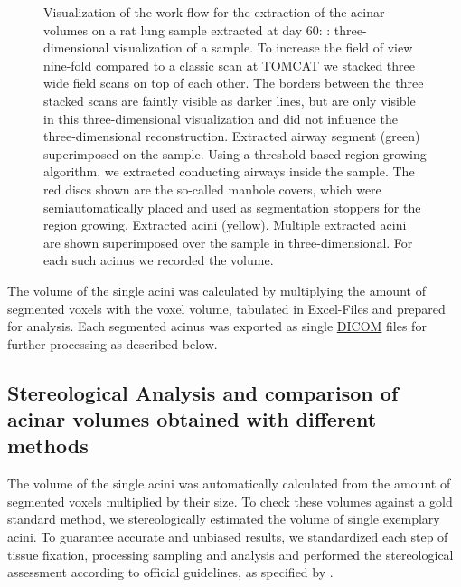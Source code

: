 \documentclass[%
	twoside,
	paper=a4,%
	abstract=true,%
	]{scrartcl}
\newlength\imagescale		%
\begin{document}
\begin{figure}
{%
		\label{subfig:extracted acini}%
		}
	\caption{Visualization of the work flow for the extraction of the acinar volumes on a rat lung sample extracted at day 60: %
		\protect{}: three-dimensional visualization of a sample. To increase the field of view nine-fold compared to a classic scan at TOMCAT we stacked three wide field scans on top of each other. The borders between the three stacked scans are faintly visible as darker lines, but are only visible in this three-dimensional visualization and did not influence the three-dimensional reconstruction. %
		\protect{} Extracted airway segment (green) superimposed on the sample. Using a threshold based region growing algorithm, we extracted conducting airways inside the sample. The red discs shown are the so-called manhole covers, which were semiautomatically placed and used as segmentation stoppers for the region growing. %
		\protect{} Extracted acini (yellow). Multiple extracted acini are shown superimposed over the sample in three-dimensional. For each such acinus we recorded the volume.%
		}
	\label{fig:workflow}
\end{figure}

The volume of the single acini was calculated by multiplying the amount of segmented voxels with the voxel volume, tabulated in Excel-Files and prepared for analysis. Each segmented acinus was exported as single \href{https://secure.wikimedia.org/wikipedia/en/w/index.php?title=Digital_Imaging_and_Communications_in_Medicine&oldid=415023605}{DICOM} files for further processing as described below.

\subsection{Stereological Analysis and comparison of acinar volumes obtained with different methods}
The volume of the single acini was automatically calculated from the amount of segmented voxels multiplied by their size. To check these volumes against a gold standard method, we stereologically estimated the volume of single exemplary acini. To guarantee accurate and unbiased results, we standardized each step of tissue fixation, processing sampling and analysis and performed the stereological assessment according to official guidelines, as specified by \citet{Hsia2010}.
\end{document}
